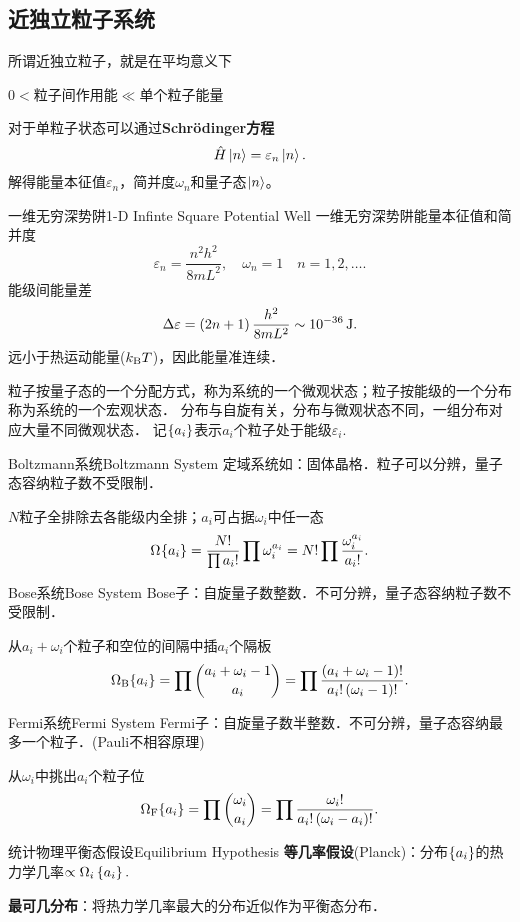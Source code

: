 \subsection{近独立粒子系统}
所谓近独立粒子，就是在平均意义下
\begin{center}
	$0<$粒子间作用能$\ll$单个粒子能量
\end{center}
对于单粒子状态可以通过\textbf{Schrödinger方程}
\[
	\hat H\ket n=\varepsilon_n\ket n.
\]
解得能量本征值$\varepsilon_n$，简并度$\omega_n$和量子态$\ket n$。
\begin{example}{一维无穷深势阱}{1-D Infinte Square Potential Well}
	一维无穷深势阱能量本征值和简并度
	\[
	\varepsilon_n=\frac{n^2h^2}{8mL^2},\quad\omega_n=1\quad n=1,2,\ldots.
\]
	能级间能量差
	\[
	\D\varepsilon=\kh{2n+1}\frac{h^2}{8mL^2}\sim\SI{e-36}\joule.
\]
	远小于热运动能量($\kB T$)，因此能量准连续．
\end{example}
粒子按量子态的一个分配方式，称为系统的一个微观状态；粒子按能级的一个分布称为系统的一个宏观状态．
分布与自旋有关，分布与微观状态不同，一组分布对应大量不同微观状态．
记$\hkh{a_i}$表示$a_i$个粒子处于能级$\varepsilon_i.$
\begin{definition}{Boltzmann系统}{Boltzmann System}
	定域系统如：固体晶格．粒子可以分辨，量子态容纳粒子数不受限制．

	$N$粒子全排除去各能级内全排；$a_i$可占据$\omega_i$中任一态
	\begin{align}
		\Om=\frac{N!}{\prod a_i!}\prod\omega_i^{a_i}=N!\prod\frac{\omega_i^{a_i}}{a_i!}.
	\end{align}
\end{definition}

\begin{definition}{Bose系统}{Bose System}
	Bose子：自旋量子数整数．不可分辨，量子态容纳粒子数不受限制．

	从$a_i+\omega_i$个粒子和空位的间隔中插$a_i$个隔板
	\begin{align}
		\Om[B]=\prod\binom{a_i+\omega_i-1}{a_i}=\prod\frac{\kh{a_i+\omega_i-1}!}{a_i!\kh{\omega_i-1}!}.
	\end{align}
\end{definition}
\begin{definition}{Fermi系统}{Fermi System}
	Fermi子：自旋量子数半整数．不可分辨，量子态容纳最多一个粒子．(Pauli不相容原理)

	从$\omega_i$中挑出$a_i$个粒子位
	\begin{align}
		\Om[F]=\prod\binom{\omega_i}{a_i}=\prod\frac{\omega_i!}{a_i!\kh{\omega_i-a_i}!}.
	\end{align}
\end{definition}
\begin{theorem}{统计物理平衡态假设}{Equilibrium Hypothesis}
	\textbf{等几率假设}(Planck)：分布$\hkh{a_i}$的热力学几率$\propto\Omega_i\hkh{a_i}.$

	\textbf{最可几分布}：将热力学几率最大的分布近似作为平衡态分布．
\end{theorem}

